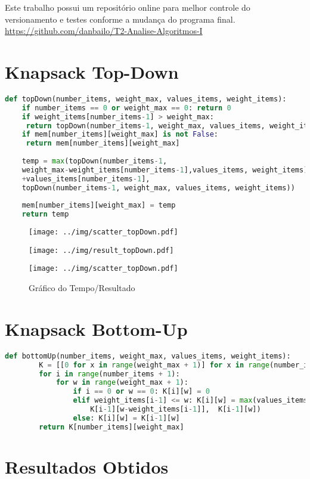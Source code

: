 \documentclass[a4paper, 12pt]{article}
\begin{document}
Este trabalho possui um repositório online para melhor controle do versionamento e testes conforme a mudança do programa final.\\
\url{https://github.com/danbailo/T2-Analise-Algoritmos-I}
\newpage

\section{Knapsack Top-Down}


\begin{lstlisting}[basicstyle=\footnotesize, language=Python]
def topDown(number_items, weight_max, values_items, weight_items):
    if number_items == 0 or weight_max == 0: return 0
    if weight_items[number_items-1] > weight_max: 
     return topDown(number_items-1, weight_max, values_items, weight_items)
    if mem[number_items][weight_max] is not False: 
     return mem[number_items][weight_max]
    
    temp = max(topDown(number_items-1, 
    weight_max-weight_items[number_items-1],values_items, weight_items)
    +values_items[number_items-1], 
    topDown(number_items-1, weight_max, values_items, weight_items))
    
    mem[number_items][weight_max] = temp
    return temp    
\end{lstlisting}

\begin{figure}[h]
    \centering
    \begin{minipage}{.6\textwidth}
      \centering
      \texttt{[image: ../img/scatter\_topDown.pdf]}
      \label{fig:test1}
    \end{minipage}%
    \begin{minipage}{.6\textwidth}
      \centering
      \texttt{[image: ../img/result\_topDown.pdf]}
      \label{fig:test2}
    \end{minipage}
    \end{figure}

\begin{figure}[h]
    \centering
    \texttt{[image: ../img/scatter\_topDown.pdf]}
    \caption{Gráfico do Tempo/Resultado}
    \label{fig:scatter_topDown}
\end{figure}

\newpage
\section{Knapsack Bottom-Up}
\begin{lstlisting}[basicstyle=\footnotesize, language=Python]
    def bottomUp(number_items, weight_max, values_items, weight_items): 
        K = [[0 for x in range(weight_max + 1)] for x in range(number_items + 1)]
        for i in range(number_items + 1): 
            for w in range(weight_max + 1): 
                if i == 0 or w == 0: K[i][w] = 0
                elif weight_items[i-1] <= w: K[i][w] = max(values_items[i-1] + 
                    K[i-1][w-weight_items[i-1]],  K[i-1][w]) 
                else: K[i][w] = K[i-1][w] 
        return K[number_items][weight_max]
    \end{lstlisting}
\newpage    

\section{Resultados Obtidos}
\end{document}

